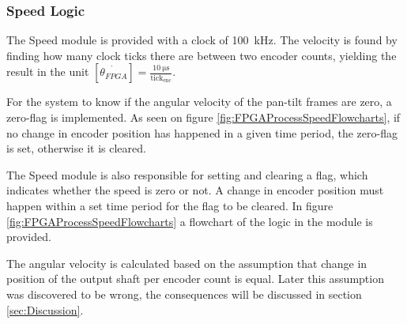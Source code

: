 \documentclass[../../main.tex]{subfiles}
\begin{document}
\subsubsection*{Speed Logic}
The Speed module is provided with a clock of \SI{100}{\kilo \hertz}. The velocity is found by finding how many clock ticks there are between two encoder counts, yielding the result in the unit $\left[\dot{\theta_{FPGA}}\right] = \frac{\SI{10}{\micro \second}}{\mathrm{tick_{enc}}}$.   


For the system to know if the angular velocity of the pan-tilt frames are zero, a zero-flag is implemented. As seen on figure \ref{fig:FPGAProcessSpeedFlowcharts}, if no change in encoder position has happened in a given time period, the zero-flag is set, otherwise it is cleared.


The Speed module is also responsible for setting and clearing a flag, which indicates whether the speed is zero or not. A change in encoder position must happen within a set time period for the flag to be cleared. In figure \ref{fig:FPGAProcessSpeedFlowcharts} a flowchart of the logic in the module is provided.
    
The angular velocity is calculated based on the assumption that change in position of the output shaft per encoder count is equal. Later this assumption was discovered to be wrong, the consequences will be discussed in section \ref{sec:Discussion}.
\end{document}
